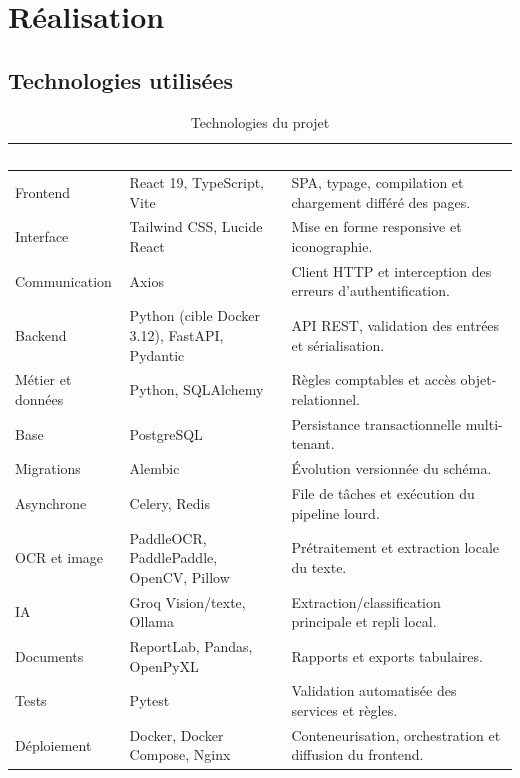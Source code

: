 \documentclass[12pt,a4paper,oneside]{report}
\newcommand{\TableSetup}{%
  \arrayrulecolor{ComptaTableLine}%
  \setlength{\arrayrulewidth}{0.45pt}%
  \renewcommand{\arraystretch}{1.18}%
}
\newcommand{\TableHead}[1]{\textcolor{white}{\textbf{#1}}}
\begin{document}
\chapter{Réalisation}

\section{Technologies utilisées}

\begin{table}[H]
\centering
\caption{Technologies du projet}
\footnotesize
\TableSetup
\begin{tabularx}{\textwidth}{|L{3.4cm}|L{4cm}|Y|}
\toprule
{}\TableHead{Domaine} & \TableHead{Technologie} & \TableHead{Rôle} \\
\midrule
Frontend & React 19, TypeScript, Vite & SPA, typage, compilation et chargement différé des pages. \\
Interface & Tailwind CSS, Lucide React & Mise en forme responsive et iconographie. \\
Communication & Axios & Client HTTP et interception des erreurs d'authentification. \\
Backend & Python (cible Docker 3.12), FastAPI, Pydantic & API REST, validation des entrées et sérialisation. \\
Métier et données & Python, SQLAlchemy & Règles comptables et accès objet-relationnel. \\
Base & PostgreSQL & Persistance transactionnelle multi-tenant. \\
Migrations & Alembic & Évolution versionnée du schéma. \\
Asynchrone & Celery, Redis & File de tâches et exécution du pipeline lourd. \\
OCR et image & PaddleOCR, PaddlePaddle, OpenCV, Pillow & Prétraitement et extraction locale du texte. \\
IA & Groq Vision/texte, Ollama & Extraction/classification principale et repli local. \\
Documents & ReportLab, Pandas, OpenPyXL & Rapports et exports tabulaires. \\
Tests & Pytest & Validation automatisée des services et règles. \\
Déploiement & Docker, Docker Compose, Nginx & Conteneurisation, orchestration et diffusion du frontend. \\
\bottomrule
\end{tabularx}
\end{table}
\end{document}
